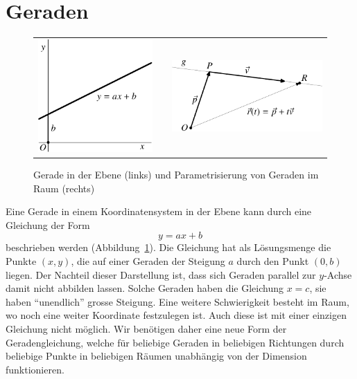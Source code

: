 \section{Geraden}
\begin{figure}
\begin{center}
\begin{tabular}{ccc}
\includegraphics{images/v-6}&%
\qquad\qquad\qquad&
\includegraphics{images/v-7}%
\end{tabular}
\end{center}
\caption{Gerade in der Ebene (links) und Parametrisierung von Geraden im
Raum (rechts) \label{image-gerade}}
\end{figure}
Eine Gerade in einem Koordinatensystem in der Ebene kann durch eine
Gleichung der Form
\[
y=ax+b
\]
beschrieben werden (Abbildung~\ref{image-gerade}).
Die Gleichung hat als Lösungsmenge die Punkte
$(x,y)$, die auf einer Geraden der Steigung $a$ durch den Punkt $(0,b)$
liegen.
Der Nachteil dieser Darstellung ist, dass sich Geraden parallel zur $y$-Achse
damit nicht abbilden lassen.
Solche Geraden haben die Gleichung $x=c$, sie haben
``unendlich'' grosse Steigung.
Eine weitere Schwierigkeit besteht im Raum, wo noch eine weiter Koordinate
festzulegen ist.
Auch diese ist mit einer einzigen Gleichung nicht möglich.
Wir benötigen daher eine neue Form der Geradengleichung, welche für beliebige
Geraden in beliebigen Richtungen durch beliebige Punkte in beliebigen Räumen
unabhängig von der Dimension funktionieren.

